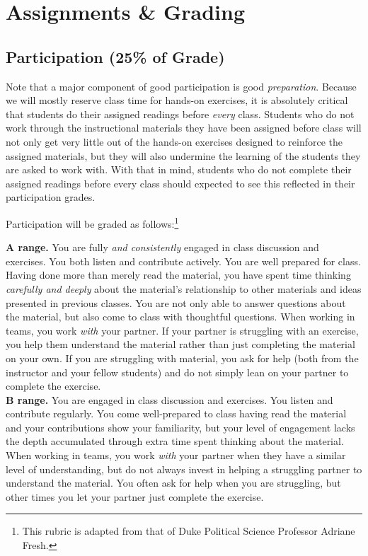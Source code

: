 \documentclass[12pt]{article}
\begin{document}
\section{Assignments \& Grading}

\subsection{Participation (25\% of Grade)}

Note that a major component of good participation is good \emph{preparation}. Because we will mostly reserve class time for hands-on exercises, it is absolutely critical that students do their assigned readings before \emph{every} class. Students who do not work through the instructional materials they have been assigned before class will not only get very little out of the hands-on exercises designed to reinforce the assigned materials, but they will also undermine the learning of the students they are asked to work with. With that in mind, students who do not complete their assigned readings before every class should expected to see this reflected in their participation grades.

Participation will be graded as follows:\footnote{This rubric is adapted from that of Duke Political Science Professor Adriane Fresh.}

\textbf{A range.}  You are fully \emph{and consistently} engaged in class discussion and exercises.  You both listen and contribute actively.  You are well prepared for class.  Having done more than merely read the material, you have spent time thinking \emph{carefully and deeply} about the material's relationship to other materials and ideas presented in previous classes. You are not only able to answer questions about the material, but also come to class with thoughtful questions.  When working in teams, you work \emph{with} your partner. If your partner is struggling with an exercise, you help them understand the material rather than just completing the material on your own. If you are struggling with material, you ask for help (both from the instructor and your fellow students) and do not simply lean on your partner to complete the exercise. \\

\textbf{B range.}  You are engaged in class discussion and exercises.  You listen and contribute regularly.  You come well-prepared to class having read the material and your contributions show your familiarity, but your level of engagement lacks the depth accumulated through extra time spent thinking about the material.  When working in teams, you work \emph{with} your partner when they have a similar level of understanding, but do not always invest in helping a struggling partner to understand the material. You often ask for help when you are struggling, but other times you let your partner just complete the exercise. \\
\end{document}
